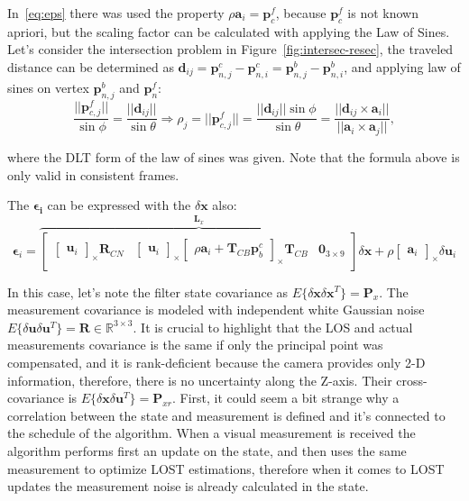 In~\eqref{eq:eps} there was used the property $\rho\mathbf{a}_i = \mathbf{p}_c^f$, because $\mathbf{p}_c^f$ is not known apriori, but the scaling factor can be calculated with applying the Law of Sines. Let's consider the intersection problem in Figure~\ref{fig:intersec-resec}, the traveled distance can be determined as $\mathbf{d}_{ij}=\mathbf{p}_{n,j}^c-\mathbf{p}_{n, i}^c = \mathbf{p}_{n,j}^b-\mathbf{p}_{n, i}^b$, and applying law of sines on vertex $\mathbf{p}_{n,j}^b$ and $\mathbf{p}_n^f$:
\begin{equation}
    \frac{||\mathbf{p}_{c,j}^f||}{\sin\phi}=\frac{||\mathbf{d}_{ij}||}{\sin\theta}\Rightarrow \rho_j=||\mathbf{p}_{c,j}^f||=\frac{||\mathbf{d}_{ij}||\sin\phi}{\sin\theta} =
    \frac{||\mathbf{d}_{ij}\times\mathbf{a}_i||}{||\mathbf{a}_i\times\mathbf{a}_j||},
\end{equation}

where the DLT form of the law of sines was given. Note that the formula above is only valid in consistent frames.

The $\boldsymbol{\epsilon_i}$ can be expressed with the $\delta\mathbf{x}$ also:
\begin{equation}
    \boldsymbol{\epsilon}_i = 
    \overbrace{
    \begin{bmatrix}
        \begin{bmatrix}
            \mathbf{u}_i
        \end{bmatrix}_\times\mathbf{R}_{CN} &
        \begin{bmatrix}
            \mathbf{u}_i
        \end{bmatrix}_\times
        \begin{bmatrix}
            \rho\mathbf{a}_i+\mathbf{T}_{CB}\mathbf{p}_b^c
        \end{bmatrix}_\times
        \mathbf{T}_{CB} &
        \mathbf{0}_{3\times 9}
    \end{bmatrix}}^{\mathbf{L}_x}
    \delta\mathbf{x} +
    \rho\begin{bmatrix}
        \mathbf{a}_i
    \end{bmatrix}_\times
    \delta\mathbf{u}_i
    \label{eq:epsilon}
\end{equation}

In this case, let's note the filter state covariance as $E\{\delta\mathbf{x}\delta\mathbf{x}^T\}=\mathbf{P}_x$. The measurement covariance is modeled with independent white Gaussian noise $E\{\delta\mathbf{u}\delta\mathbf{u}^T\}=\mathbf{R}\in\mathbb{R}^{3\times 3}$. It is crucial to highlight that the LOS and actual measurements covariance is the same if only the principal point was compensated, and it is rank-deficient because the camera provides only 2-D information, therefore, there is no uncertainty along the Z-axis. Their cross-covariance is $E\{\delta\mathbf{x}\delta\mathbf{u}^T\}=\mathbf{P}_{xr}$. First, it could seem a bit strange why a correlation between the state and measurement is defined and it's connected to the schedule of the algorithm. When a visual measurement is received the algorithm performs first an update on the state, and then uses the same measurement to optimize LOST estimations, therefore when it comes to LOST updates the measurement noise is already calculated in the state. 

